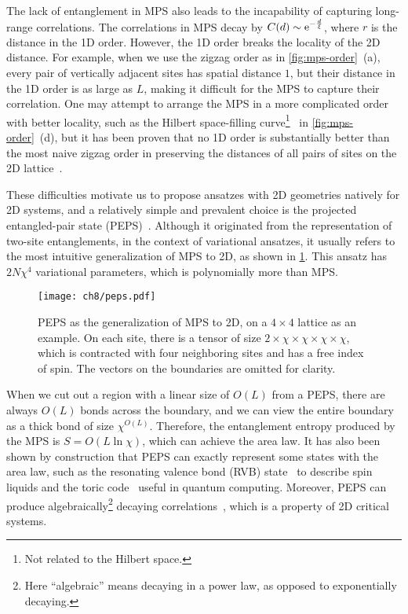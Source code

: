 The lack of entanglement in MPS also leads to the incapability of capturing long-range correlations. The correlations in MPS decay by $C(d) \sim \mathrm{e}^{-\frac{d}{\xi}}$, where $r$ is the distance in the 1D order. However, the 1D order breaks the locality of the 2D distance. For example, when we use the zigzag order as in \cref{fig:mps-order}~(a), every pair of vertically adjacent sites has spatial distance $1$, but their distance in the 1D order is as large as $L$, making it difficult for the MPS to capture their correlation. One may attempt to arrange the MPS in a more complicated order with better locality, such as the Hilbert space-filling curve\footnote{Not related to the Hilbert space.}~\cite{hilbert1891uber} in \cref{fig:mps-order}~(d), but it has been proven that no 1D order is substantially better than the most naive zigzag order in preserving the distances of all pairs of sites on the 2D lattice~\cite{xu2012lower}.

These difficulties motivate us to propose ansatzes with 2D geometries natively for 2D systems, and a relatively simple and prevalent choice is the projected entangled-pair state (PEPS)~\cite{verstraete2004renormalization, verstraete2008matrix}. Although it originated from the representation of two-site entanglements, in the context of variational ansatzes, it usually refers to the most intuitive generalization of MPS to 2D, as shown in \cref{fig:peps}. This ansatz has $2 N \chi^4$ variational parameters, which is polynomially more than MPS.

\begin{figure}[htb]
\centering
\texttt{[image: ch8/peps.pdf]}
\caption[Projected entangled-pair state (PEPS)]{
PEPS as the generalization of MPS to 2D, on a $4 \times 4$ lattice as an example.
On each site, there is a tensor of size $2 \times \chi \times \chi \times \chi \times \chi$, which is contracted with four neighboring sites and has a free index of spin.
The vectors on the boundaries are omitted for clarity.
}
\label{fig:peps}
\end{figure}

When we cut out a region with a linear size of $O(L)$ from a PEPS, there are always $O(L)$ bonds across the boundary, and we can view the entire boundary as a thick bond of size $\chi^{O(L)}$. Therefore, the entanglement entropy produced by the MPS is $S = O(L \ln \chi)$, which can achieve the area law. It has also been shown by construction that PEPS can exactly represent some states with the area law, such as the resonating valence bond (RVB) state~\cite{schuch2012resonating} to describe spin liquids and the toric code~\cite{kitaev2003fault, schuch2010peps} useful in quantum computing. Moreover, PEPS can produce algebraically\footnote{Here ``algebraic'' means decaying in a power law, as opposed to exponentially decaying.} decaying correlations~\cite{verstraete2006criticality}, which is a property of 2D critical systems.

